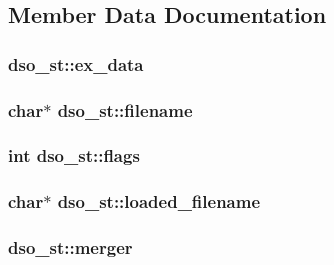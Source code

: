 \subsection{Member Data Documentation}
\subsubsection[{\texorpdfstring{ex\+\_\+data}{ex_data}}]{ dso\+\_\+st\+::ex\+\_\+data}\hypertarget{structdso__st_a77898a2a84603a2bca699d2d6dcf9b8f}{}\label{structdso__st_a77898a2a84603a2bca699d2d6dcf9b8f}
\subsubsection[{\texorpdfstring{filename}{filename}}]{\setlength{\rightskip}{0pt plus 5cm}char$\ast$ dso\+\_\+st\+::filename}\hypertarget{structdso__st_ae981476b0fae6034675c02776f7303d8}{}\label{structdso__st_ae981476b0fae6034675c02776f7303d8}
\subsubsection[{\texorpdfstring{flags}{flags}}]{\setlength{\rightskip}{0pt plus 5cm}int dso\+\_\+st\+::flags}\hypertarget{structdso__st_a474a4c01444751dbf14d9ac94729e9b0}{}\label{structdso__st_a474a4c01444751dbf14d9ac94729e9b0}
\subsubsection[{\texorpdfstring{loaded\+\_\+filename}{loaded_filename}}]{\setlength{\rightskip}{0pt plus 5cm}char$\ast$ dso\+\_\+st\+::loaded\+\_\+filename}\hypertarget{structdso__st_a96bd03d5fd52dba938c3ba0e28b74946}{}\label{structdso__st_a96bd03d5fd52dba938c3ba0e28b74946}
\subsubsection[{\texorpdfstring{merger}{merger}}]{ dso\+\_\+st\+::merger}\hypertarget{structdso__st_a00298e1ff0f65f22b0ec1229d7e8bac1}{}\label{structdso__st_a00298e1ff0f65f22b0ec1229d7e8bac1}
